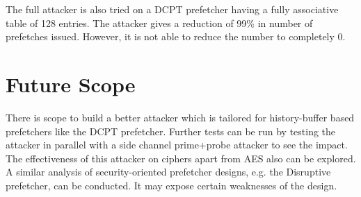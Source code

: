 The full attacker is also tried on a DCPT prefetcher having a fully associative
table of 128 entries. The attacker gives a reduction of 99\% in number of prefetches
issued. However, it is not able to reduce the number to completely 0.

\section{Future Scope}

There is scope to build a better attacker which is tailored for history-buffer
based prefetchers like the DCPT prefetcher.
Further tests can be run by testing the attacker in parallel with a side
channel prime+probe attacker to see the impact. The effectiveness of this
attacker on ciphers apart from AES also can be explored.
A similar analysis of security-oriented prefetcher designs, e.g. the Disruptive prefetcher,
can be conducted. It may expose certain weaknesses of the design.

